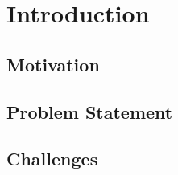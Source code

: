 
\chapter{Introduction}
\label{ch:Introduction}



\section{Motivation}
\label{sec:Introduction:Motivation}

\section{Problem Statement}
\label{sec:Introduction:ProblemStatement}

\section{Challenges}
\label{sec:Introduction:Challenges}
